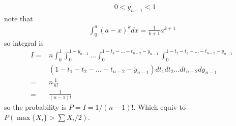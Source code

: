 \documentclass[paper=a4, fontsize=11pt]{scrartcl} %
\numberwithin{equation}{section} %
\numberwithin{figure}{section} %
\numberwithin{table}{section} %
\begin{document}
\begin{itemize}
\begin{itemize}
\begin{align}
			& 0<y_{n-1}<1
		\end{align}
		note that
		\begin{align}
			\int_0^a (a-x)^kdx = \frac{1}{k+1} a^{k+1}
		\end{align}
		so integral is
		\begin{align}
			I =& n \int_0^1 \int_0^{1-y_{n-1}}\dots \int_0^{1-t_3-\dots-t_{n-2}-y_{n-1}}\int_0^{1-t_2-t_3-\dots-t_{n-2}-y_{n-1}} \\
			&(1-t_1-t_2-\dots-t_{n-2}-y_{n-1}) dt_1dt_2\dots dt_{n-2}dy_{n-1} \\
			=& n \frac{1}{n!} \\
			=& \frac{1}{(n-1)!}
		\end{align}
		so the probability is $P=I=1/(n-1)!$. Which equiv to $P(\max\{X_i\} > \sum X_i /2)$.
	\end{itemize}
\end{itemize}
\end{document}
